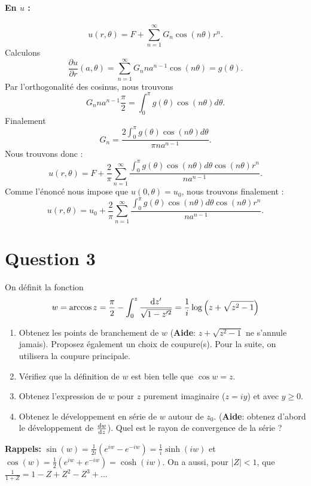 {\begin{enumerate}
      \paragraph{En $u$ :}
      $$u(r,\theta) = F + \sum_{n=1}^{\infty} G_n\cos(n\theta)r^n.$$
      Calculons
      $$\frac{\partial u}{\partial r}(a,\theta) = \sum_{n=1}^{\infty}G_n n a^{n-1} \cos(n\theta) = g(\theta).$$
      Par l'orthogonalité des cosinus, nous trouvons 
      $$G_n n a^{n-1}\frac{\pi}{2} = \int_0^{\pi}g(\theta) \cos(n\theta) d\theta.$$
      Finalement 
      $$G_n = \frac{2\int_0^{\pi}g(\theta) \cos(n\theta) d\theta}{\pi n a^{n-1}}.$$
      Nous trouvons donc :
      $$u(r,\theta) = F + \frac{2}{\pi}\sum_{n=1}^{\infty} \frac{\int_0^{\pi}g(\theta) \cos(n\theta) d\theta \cos(n\theta)r^n}{ n a^{n-1}}.$$
      Comme l'énoncé nous impose que $u(0,\theta) = u_0$, nous trouvons finalement :
      $$u(r,\theta) = u_0 + \frac{2}{\pi}\sum_{n=1}^{\infty} \frac{\int_0^{\pi}g(\theta) \cos(n\theta) d\theta \cos(n\theta)r^n}{ n a^{n-1}}.$$
  \end{enumerate}
}


\section*{Question 3}
On définit la fonction $$w = \arccos z = \frac{\pi}{2}-\int_0^z\frac{\operatorname{d}\! z'}{\sqrt{1-z'^2}} = \frac{1}{i}\log \left(z+\sqrt{z^2-1}\right)$$
\begin{enumerate}
\item Obtenez les points de branchement de $w$ (\textbf{Aide}: $z+\sqrt{z^2-1}$ ne s'annule jamais). Proposez également un choix de coupure(s). Pour la suite, on utilisera la coupure principale.
\item Vérifiez que la définition de $w$ est bien telle que $\cos w = z$.
\item Obtenez l'expression de $w$ pour $z$ purement imaginaire ($z = iy$) et avec $y\geq 0$.
\item Obtenez le développement en série de $w$ autour de $z_0$. (\textbf{Aide}: obtenez d'abord le développement de $\frac{dw}{\operatorname{d}\! z}$). Quel est le rayon de convergence de la série ? 
\end{enumerate}
\textbf{Rappels:} $\sin(w) = \frac{1}{2i}\left(e^{iw}-e^{-iw}\right)
= \frac{1}{i}\sinh(iw)$ et
$\cos(w) = \frac{1}{2}\left(e^{iw}+e^{-iw}\right) = \cosh(iw)$.
On a aussi, pour $|Z| < 1$, que
$\frac{1}{1+Z} = 1 - Z + Z^2 - Z^3 + \ldots$


